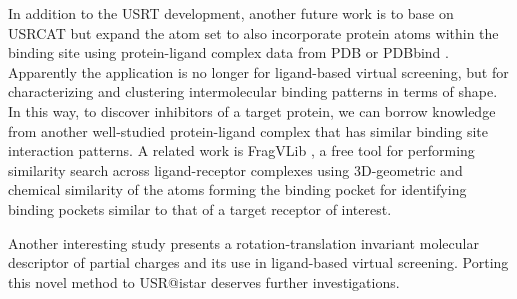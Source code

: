 In addition to the USRT development, another future work is to base on USRCAT \citep{1331} but expand the atom set to also incorporate protein atoms within the binding site using protein-ligand complex data from PDB \citep{540,537} or PDBbind \citep{529,530,1426}. Apparently the application is no longer for ligand-based virtual screening, but for characterizing and clustering intermolecular binding patterns in terms of shape. In this way, to discover inhibitors of a target protein, we can borrow knowledge from another well-studied protein-ligand complex that has similar binding site interaction patterns. A related work is FragVLib \citep{1247}, a free tool for performing similarity search across ligand-receptor complexes using 3D-geometric and chemical similarity of the atoms forming the binding pocket for identifying binding pockets similar to that of a target receptor of interest.%

Another interesting study \citep{1389} presents a rotation-translation invariant molecular descriptor of partial charges and its use in ligand-based virtual screening. Porting this novel method to USR@istar deserves further investigations.

\chapterend
